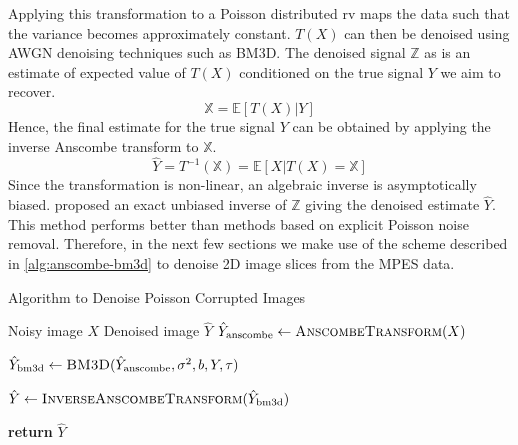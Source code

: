 Applying this transformation to a Poisson distributed \gls{rv} maps the data such that the variance becomes approximately constant. $T(X)$ can then be denoised using \gls{AWGN} denoising techniques such as \gls{BM3D}. 
The denoised signal $\mathbb{Z}$  as is an estimate of expected value of $T(X)$ conditioned on the true signal $Y$ we aim to recover.
\begin{equation}
    \mathbb{X} = \mathbb{E}[T(X) | Y]
\end{equation}
Hence, the final estimate for the true signal $Y$ can be obtained by applying the inverse Anscombe transform to $\mathbb{X}$.
\begin{equation}
    \hat{Y} = T^{-1}(\mathbb{X}) = \mathbb{E}[X | T(X) = \mathbb{X}]
\end{equation}
Since the transformation is non-linear, an algebraic inverse is asymptotically biased. \citeauthor{makitaloOptimalInversionAnscombe2011} \cite{makitaloOptimalInversionAnscombe2011} proposed an exact unbiased inverse of $\mathbb{Z}$ giving the denoised estimate $\hat{Y}$. This method performs better than methods based on explicit Poisson noise removal. Therefore, in the next few sections we make use of the scheme described in \cref{alg:anscombe-bm3d} to denoise 2D image slices from the \gls{MPES} data.

\begin{algorithm}
    \caption{Algorithm to Denoise Poisson Corrupted Images}\label{alg:anscombe-bm3d}
    \begin{algorithmic}[1]
    \Require Noisy image $X$
    \Ensure Denoised image $\hat{Y}$
    \Statex
        \State $\hat{Y}_{\text{anscombe}} \gets \textsc{AnscombeTransform}(X)$
        
        \State $\hat{Y}_{\text{bm3d}} \gets \textsc{BM3D}(\hat{Y}_{\text{anscombe}}, \sigma^2, b, Y, \tau)$
        
        \State $\hat{Y} \gets \textsc{InverseAnscombeTransform}(\hat{Y}_{\text{bm3d}})$
        
        \State \textbf{return} $\hat{Y}$
    \EndProcedure
    \end{algorithmic}
\end{algorithm}

